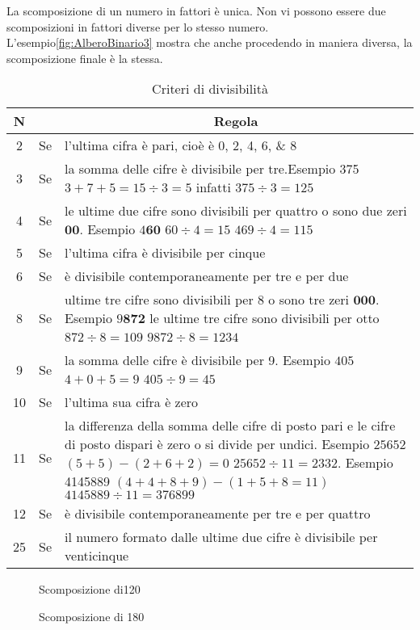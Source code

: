 La scomposizione di un numero in fattori è unica. Non vi possono essere due scomposizioni in fattori diverse per lo stesso numero. L'esempio\nobs\vref{fig:AlberoBinario3} mostra che anche procedendo in maniera diversa, la scomposizione finale è la stessa.
\begin{table}
\centering
\begin{tabular}{ccp{}}
\toprule  N&  &\multicolumn{1}{c}{Regola}   \\ 
\midrule 2 & Se & l'ultima cifra è pari, cioè è  \numlist{0;2;4;6;8} \\ 
3 & Se & la somma delle cifre è divisibile per tre.Esempio \num{375} $3+7+5=15\div3=5$ infatti $375\div 3=125$ \\ 
 4 & Se & le ultime due cifre sono divisibili per quattro o sono due zeri $\mathbf{00}$. Esempio $4\mathbf{60}$ $60\div 4=15$ $469\div 4=115$ \\
 5 & Se & l'ultima cifra è divisibile per cinque \\  
 6 & Se & è divisibile contemporaneamente per tre e per due  \\  
 8 & Se & ultime tre cifre sono divisibili per 8 o sono tre zeri $\mathbf{000}$. Esempio $9\mathbf{872}$ le ultime tre cifre sono divisibili per otto $872\div 8= 109$ $9872\div 8=1234$ \\  
 9 & Se & la somma delle cifre è divisibile per 9. Esempio $405$ $4+0+5=9$ $405\div9=45$  \\
 10 & Se & l'ultima sua cifra è zero \\
 11 & Se& la differenza della somma delle cifre di posto pari e le cifre di posto dispari è zero o si divide per undici. Esempio $25652$ $(5+5)-(2+6+2)=0$ $25652\div 11=2332$. Esempio \num{4145889} $(4+4+8+9)-(1+5+8=11)$ $4145889\div 11=376899$  \\    
 12 & Se & è divisibile contemporaneamente per tre e per quattro  \\  
 25 & Se & il numero  formato dalle ultime due cifre è divisibile per venticinque\\
\bottomrule
\end{tabular}
\caption{Criteri di divisibilità}
\label{tab:criteriDivisitilità}
\end{table} 
\begin{figure}
		\centering

	\caption[]{Scomposizione di\num{120}}
	\label{fig:AlberoBinario1}
\end{figure}
\begin{figure} 
	\centering

	\caption[]{Scomposizione di \num{180}}
	\label{fig:AlberoBinario2}
\end{figure}
